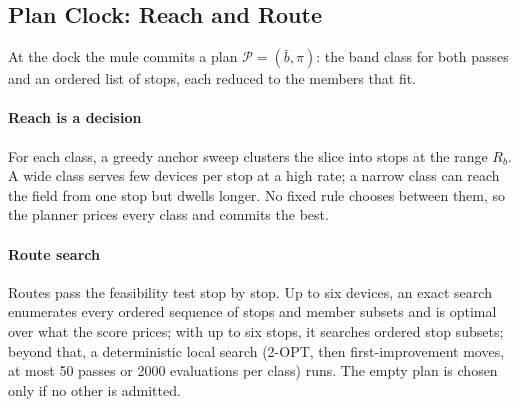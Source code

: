 \documentclass[conference]{IEEEtran}
\newcommand{\bbar}{\bar{b}}
\begin{document}
\subsection{Plan Clock: Reach and Route}
\label{sec:method:plan}

At the dock the mule commits a plan $\mathcal{P}=(\bbar,\pi)$: the band class for
both passes and an ordered list of stops, each reduced to the members that fit.

\paragraph{Reach is a decision}
For each class, a greedy anchor sweep clusters the slice into stops at the range
$R_b$. A wide class serves few devices per stop at a high rate; a narrow class
can reach the field from one stop but dwells longer. No fixed rule chooses
between them, so the planner prices every class and commits the best.

\paragraph{Route search}
Routes pass the feasibility test stop by stop. Up to six devices, an exact search
enumerates every ordered sequence of stops and member subsets and is optimal over
what the score prices; with up to six stops, it searches ordered stop subsets;
beyond that, a deterministic local search (2-OPT, then first-improvement moves,
at most 50 passes or 2000 evaluations per class) runs. The empty plan is chosen only if no
other is admitted.
\end{document}
